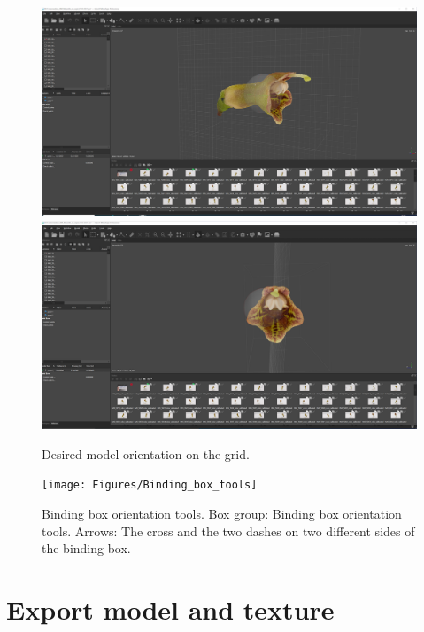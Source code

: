 \documentclass[
]{book}
\begin{document}
\begin{figure}

{\centering \includegraphics[width=1\linewidth]{Figures/metashape_orientation} \includegraphics[width=1\linewidth]{Figures/metashape_orientation_2} 

}

\caption{Desired model orientation on the grid.}\label{fig:model-orientation}
\end{figure}

\begin{figure}

{\centering \texttt{[image: Figures/Binding\_box\_tools]} 

}

\caption{Binding box orientation tools. Box group: Binding box orientation tools. Arrows: The cross and the two dashes on two different sides of the binding box.}\label{fig:binding-box-tools}
\end{figure}

\hypertarget{export-model-and-texture}{%
\section{Export model and texture}\label{export-model-and-texture}}
\end{document}
